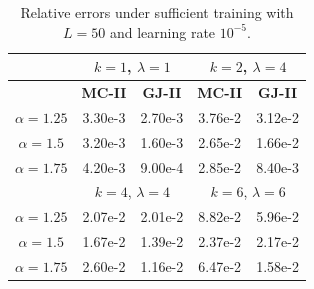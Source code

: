 \documentclass[preprint,3p,times]{elsarticle}
\begin{document}
\begin{table}[htbp]
    \centering
    
    \begin{tabular}{|c|cc|cc|}
        \hline
                      & \multicolumn{2}{c|}{$k=1$, $\lambda=1$}                & \multicolumn{2}{c|}{$k=2$, $\lambda=4$}              \\ \hline
                      & \multicolumn{1}{c|}{\textbf{MC-II}}  & \textbf{GJ-II}  & \multicolumn{1}{c|}{\textbf{MC-II}} & \textbf{GJ-II} \\ \hline
        $\alpha=1.25$ & \multicolumn{1}{c|}{3.30e-3}          & 2.70e-3      & \multicolumn{1}{c|}{3.76e-2}        & 3.12e-2        \\ \hline
        $\alpha=1.5$ & \multicolumn{1}{c|}{3.20e-3}          & 1.60e-3         & \multicolumn{1}{c|}{2.65e-2}        & 1.66e-2        \\ \hline
        $\alpha=1.75$ & \multicolumn{1}{c|}{4.20e-3}          & 9.00e-4         & \multicolumn{1}{c|}{2.85e-2}        & 8.40e-3        \\ \hline
                      & \multicolumn{2}{c|}{$k=4$, $\lambda=4$} & \multicolumn{2}{c|}{$k=6$, $\lambda=6$}              \\ \hline
        $\alpha=1.25$ & \multicolumn{1}{c|}{2.07e-2}         & 2.01e-2         & \multicolumn{1}{c|}{8.82e-2}        & 5.96e-2        \\ \hline
        $\alpha=1.5$ & \multicolumn{1}{c|}{1.67e-2}          & 1.39e-2         & \multicolumn{1}{c|}{2.37e-2}        & 2.17e-2        \\ \hline
        $\alpha=1.75$ & \multicolumn{1}{c|}{2.60e-2}         & 1.16e-2        & \multicolumn{1}{c|}{6.47e-2}        & 1.58e-2        \\ \hline
        \end{tabular}
    \caption{Relative errors under sufficient training with $L=50$ and learning rate $10^{-5}$.}
    \label{tab:largeL}
    \end{table}
\end{document}
